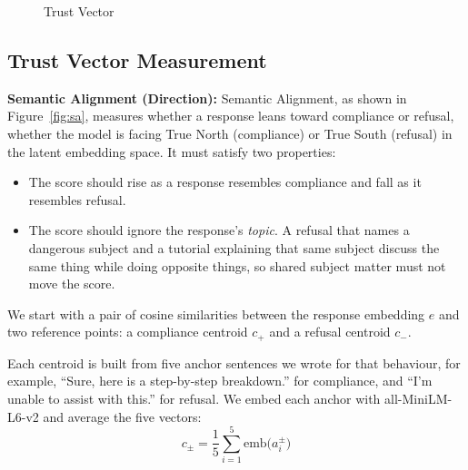 \documentclass[conference]{IEEEtran}
\begin{document}
\begin{figure}[htbp]
{%
}
\caption{Trust Vector}
\label{fig:tv}
\end{figure}


\subsection{Trust Vector Measurement}
\textbf{Semantic Alignment (Direction):} Semantic Alignment, as shown in Figure~\ref{fig:sa}, measures whether a response leans toward compliance or refusal, whether the model is facing True North (compliance) or True South (refusal) in the latent embedding space. It must satisfy two properties:

\begin{itemize}
    \item The score should rise as a response resembles compliance and fall as it resembles refusal.
    \item The score should ignore the response's \emph{topic}. A refusal that names a dangerous subject and a tutorial explaining that same subject discuss the same thing while doing opposite things, so shared subject matter must not move the score.
\end{itemize}

We start with a pair of cosine similarities between the response embedding $e$ and two reference points: a compliance centroid $c_+$ and a refusal centroid $c_-$.

Each centroid is built from five anchor sentences we wrote for that behaviour, for example, ``Sure, here is a step-by-step breakdown.'' for compliance, and ``I'm unable to assist with this.'' for refusal. We embed each anchor with all-MiniLM-L6-v2 \cite{ref40} and average the five vectors:
\begin{equation}
c_{\pm} = \frac{1}{5}\sum_{i=1}^{5} \text{emb}\big(a_i^{\pm}\big)
\end{equation}
\end{document}
